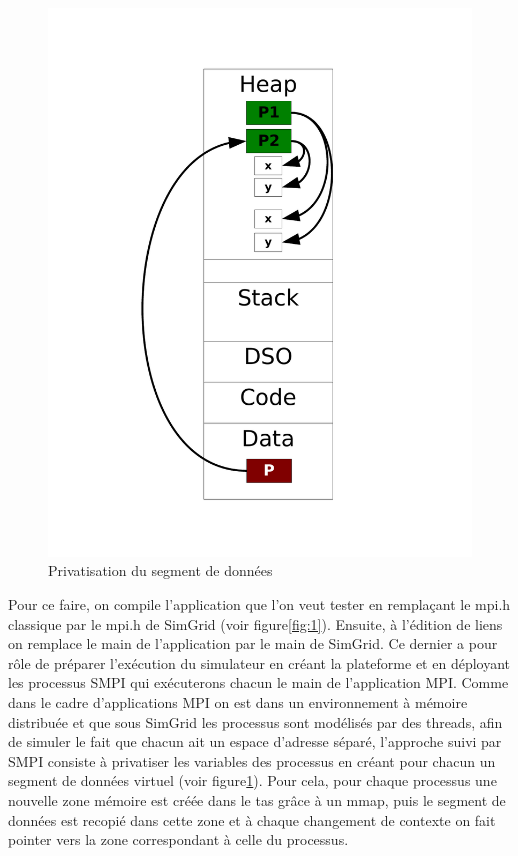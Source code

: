 \documentclass[smallextended]{svjour3}
\begin{document}
\begin{figure}[htb]
\begin{minipage}{.45\linewidth}
    \includegraphics[width=\linewidth]{./Img/Memoire.pdf}
    \caption{\label{fig:2}Privatisation du segment de données}
  \end{minipage}
\end{figure}

Pour ce faire, on compile l'application que l'on veut tester en
remplaçant le mpi.h classique par le mpi.h de SimGrid (voir
figure\ref{fig:1}). Ensuite, à l'édition de liens on remplace 
le main de l'application par le main de SimGrid. Ce dernier a pour
rôle de préparer l'exécution du simulateur en créant la plateforme
et en déployant les processus SMPI qui exécuterons chacun le main
de l'application MPI. Comme dans le cadre d'applications MPI on est
dans un environnement à mémoire distribuée et que sous SimGrid les
processus sont modélisés par des threads, afin de simuler le fait
que chacun ait un espace d'adresse séparé, l'approche suivi par SMPI
consiste à privatiser les variables des processus en créant pour
chacun un segment de données virtuel (voir figure\ref{fig:2}). Pour
cela, pour chaque processus une nouvelle zone mémoire est créée
dans le tas grâce à un mmap, puis le segment de données est recopié
dans cette zone et à chaque changement de contexte on fait pointer
vers la zone correspondant à celle du processus. 
\end{document}
